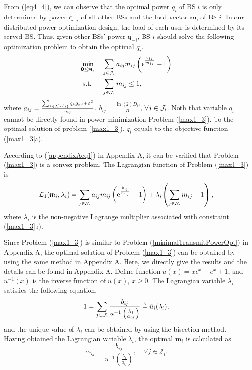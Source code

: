 \documentclass[journal]{IEEEtran}
\begin{document}
From (\ref{eq4_4}), we can observe that the optimal power $q_i$ of BS $i$ is only determined by  power
$\pmb q_{-i}$ of all other BSs and the load vector $\pmb{m}_i$ of BS $i$.
In our distributed power optimization design, the load of each user is determined by its served BS.
Thus, given other BSs' power $\pmb q_{-i}$, BS $i$ should solve the following optimization problem to obtain the optimal $q_i$.
\begin{subequations}\label{max1_3}
\begin{align}
\mathop{\min}_{\pmb{0}\leq\pmb{m}_i}\quad
&\sum_{j \in {\cal{J}}_i }
a_{ij} m_{ij}
\left( \text e^\frac{b_{ij}}{ m_{ij}} -1 \right)
\\
\textrm{s.t.}\qquad \!\!\!
&\sum_{j \in {\cal{J}}_i }
m_{ij}\leq 1,
\end{align}
\end{subequations}
where $a_{ij}=\frac{\sum_{k \in {\cal{N}}\setminus \{i\}}  q_k g_{kj} +\sigma ^2}
{g_{ij}}$, $b_{ij}=\frac {\ln(2)D_{ij}}  {B} $, $\forall j \in {\cal{J}}_i$.
Noth that variable $q_i$ cannot be directly found in power minimization Problem (\ref{max1_3}).
To the optimal solution of problem (\ref{max1_3}), $q_i$ equals to the objective function (\ref{max1_3}a).

According to (\ref{appendixAeq1}) in Appendix A,
it can be verified that Problem (\ref{max1_3}) is a convex problem.
The Lagrangian function of Problem (\ref{max1_3}) is
\begin{equation*}\label{eq9}
\mathcal L_1(\pmb{m}_i, \lambda_i)=
\sum_{j \in {\cal{J}}_i }
a_{ij} m_{ij}
\left(\text  e^{\frac{b_{ij}} {m_{ij}} }-1
\right) + \lambda_i \left(\sum_{j \in {\cal{J}}_i }
m_{ij}-1\right),
\end{equation*}
where $\lambda_i$ is the non-negative Lagrange multiplier associated with constraint (\ref{max1_3}b).

Since Problem (\ref{max1_3}) is similar to Problem (\ref{minimalTransmitPowerOpt}) in Appendix A, the optimal solution of Problem (\ref{max1_3}) can be obtained by using the same method in Appendix A.
Here, we directly give the results and the details can be found in Appendix A.
Define function $u(x)= x e^x -e^x +1$, and $u^{-1}(x)$ is the inverse function of $u(x)$, $x \geq 0$.
The Lagrangian variable $\lambda_i$ satisfies the following equation,
\begin{equation}\label{eq11}
1 =\sum_{j \in {\cal{J}}_i }
\frac{b_{ij}} { u^{-1} \left(\frac { \lambda_i} {a_{ij}} \right)} \triangleq  \hat u_i(\lambda_i) ,
\end{equation}
and the unique value of $\lambda_i$ can be obtained by using the bisection method.
Having obtained the Lagrangian variable $\lambda_i$, the optimal $\pmb m_i$ is calculated as
\begin{equation}
m_{ij}=\frac{b_{ij}} { u^{-1} \left(\frac { \lambda_i} {a_{ij}} \right)}, \quad\forall j \in \mathcal J_i.
\end{equation}
\end{document}
